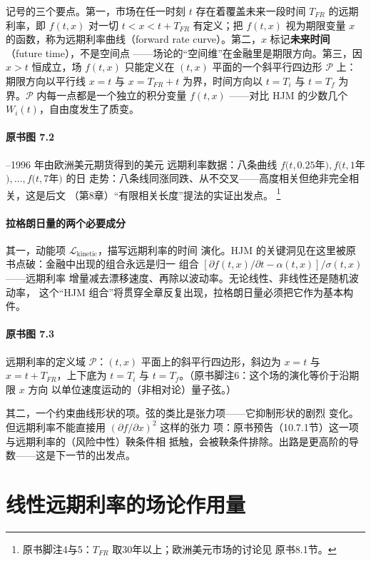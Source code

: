 记号的三个要点。第一，市场在任一时刻 $t$ 存在着覆盖未来一段时间
$T_{FR}$ 的远期利率，即 $f(t,x)$ 对一切 $t<x<t+T_{FR}$ 有定义；把
$f(t,x)$ 视为期限变量 $x$ 的函数，称为远期利率曲线（forward rate
curve）。第二，$x$ 标记\textbf{未来时间}（future time），不是空间点
——场论的“空间维”在金融里是期限方向。第三，因 $x>t$ 恒成立，场
$f(t,x)$ 只能定义在 $(t,x)$ 平面的一个斜平行四边形 $\mathcal{P}$ 上：
期限方向以平行线 $x=t$ 与 $x=T_{FR}+t$ 为界，时间方向以 $t=T_i$ 与
$t=T_f$ 为界。$\mathcal{P}$ 内每一点都是一个独立的积分变量 $f(t,x)$
——对比 HJM 的少数几个 $W_i(t)$，自由度发生了质变。

\paragraph{原书图 7.2}--1996 年由欧洲美元期货得到的美元
远期利率数据：八条曲线
$f(t,0.25$年$),f(t,1$年$),\ldots,f(t,7$年$)$ 的日
走势：八条线同涨同跌、从不交叉——高度相关但绝非完全相关，这是后文
（第8章）“有限相关长度”提法的实证出发点。
\footnote{原书脚注4与5：$T_{FR}$ 取30年以上；欧洲美元市场的讨论见
原书8.1节。}

\paragraph{拉格朗日量的两个必要成分}
其一，动能项 $\mathcal{L}_{\mathrm{kinetic}}$，描写远期利率的时间
演化。HJM 的关键洞见在这里被原书点破：金融中出现的组合永远是归一
组合
$[\partial f(t,x)/\partial t-\alpha(t,x)]/\sigma(t,x)$——远期利率
增量减去漂移速度、再除以波动率。无论线性、非线性还是随机波动率，
这个“HJM 组合”将贯穿全章反复出现，拉格朗日量必须把它作为基本构件。

\paragraph{原书图 7.3}\quad 远期利率的定义域 $\mathcal{P}$：$(t,x)$
平面上的斜平行四边形，斜边为 $x=t$ 与 $x=t+T_{FR}$，上下底为
$t=T_i$ 与 $t=T_f$。（原书脚注6：这个场的演化等价于沿期限 $x$ 方向
以单位速度运动的（非相对论）量子弦。）

其二，一个约束曲线形状的项。弦的类比是张力项——它抑制形状的剧烈
变化。但远期利率不能直接用 $(\partial f/\partial x)^2$ 这样的张力
项：原书预告（10.7.1节）这一项与远期利率的（风险中性）鞅条件相
抵触，会被鞅条件排除。出路是更高阶的导数——这是下一节的出发点。

\section{线性远期利率的场论作用量}

